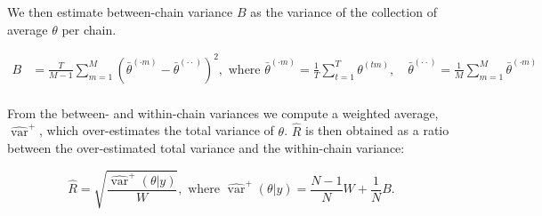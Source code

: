 \documentclass[article]{jss}
\begin{document}
We then estimate between-chain variance $B$ as the variance of the collection of average $\theta$ per chain.

\begin{align*}
B&=\frac{T}{M-1} \sum_{m=1}^{M}\left(\bar{\theta}^{(\cdot m)}-\bar{\theta}^{(\cdot \cdot)}\right)^{2}, \text { where } \bar{\theta}^{(\cdot m)}=\frac{1}{T} \sum_{t=1}^{T} \theta^{(t m)}, \quad \bar{\theta}^{(\cdot \cdot)}=\frac{1}{M} \sum_{m=1}^{M} \bar{\theta}^{(\cdot m)} \\
\end{align*}

From the between- and within-chain variances we compute a weighted average, $\widehat{\operatorname{var}}^{+}$, which over-estimates the total variance of $\theta$. $\widehat{R}$ is then obtained as a ratio between the over-estimated total variance and the within-chain variance:

\begin{equation*}
\widehat{R}=\sqrt{\frac{\widehat{\operatorname{var}}^{+}(\theta | y)}{W}},
\text{ where } \widehat{\operatorname{var}}^{+}(\theta | y)=\frac{N-1}{N} W+\frac{1}{N} B.
\end{equation*}



% 
\end{document}
